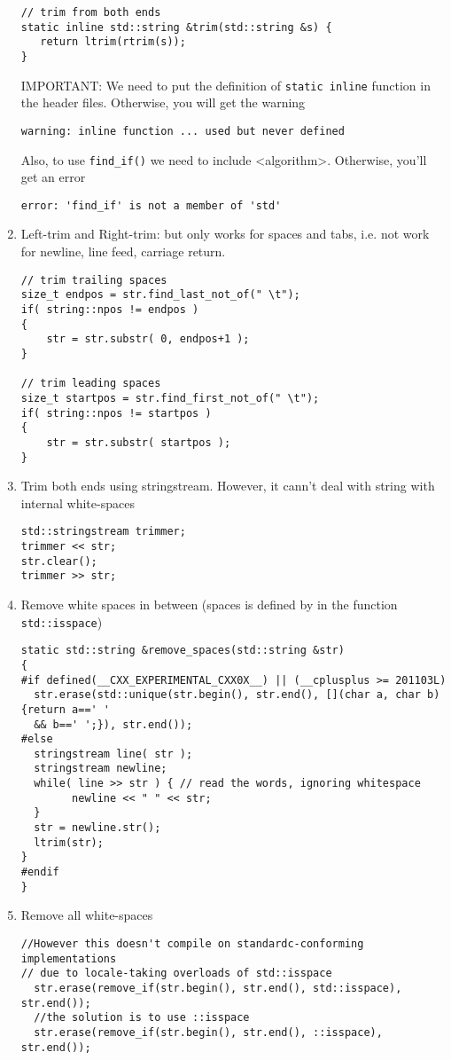 \begin{enumerate}
\begin{verbatim}
// trim from both ends
static inline std::string &trim(std::string &s) {
   return ltrim(rtrim(s));
}  
  \end{verbatim}
IMPORTANT: We need to put the definition of \verb!static inline! function in the
header files. Otherwise, you will get the warning
\begin{verbatim}
warning: inline function ... used but never defined
\end{verbatim}
Also, to use \verb!find_if()! we need to include <algorithm>. Otherwise, you'll
get an error
\begin{verbatim}
error: 'find_if' is not a member of 'std'
\end{verbatim}
  
  \item Left-trim and Right-trim: but only works for spaces and tabs, i.e. not
  work for newline, line feed, carriage return.
\begin{verbatim}
// trim trailing spaces
size_t endpos = str.find_last_not_of(" \t");
if( string::npos != endpos )
{
    str = str.substr( 0, endpos+1 );
}

// trim leading spaces
size_t startpos = str.find_first_not_of(" \t");
if( string::npos != startpos )
{
    str = str.substr( startpos );
}
\end{verbatim}
  \item Trim both ends using stringstream. However, it cann't
  deal with string with internal white-spaces
\begin{verbatim}
std::stringstream trimmer;
trimmer << str;
str.clear();
trimmer >> str;
\end{verbatim}

  \item Remove white spaces in between (spaces is defined by in the function
  \verb!std::isspace!)
\begin{verbatim}
static std::string &remove_spaces(std::string &str)
{
#if defined(__CXX_EXPERIMENTAL_CXX0X__) || (__cplusplus >= 201103L)
  str.erase(std::unique(str.begin(), str.end(), [](char a, char b){return a==' '
  && b==' ';}), str.end());
#else
  stringstream line( str );
  stringstream newline;
  while( line >> str ) { // read the words, ignoring whitespace
        newline << " " << str;
  }
  str = newline.str();
  ltrim(str);
}
#endif
}
\end{verbatim}
 
  \item Remove all white-spaces
\begin{verbatim}
//However this doesn't compile on standardc-conforming implementations
// due to locale-taking overloads of std::isspace
  str.erase(remove_if(str.begin(), str.end(), std::isspace), str.end());
  //the solution is to use ::isspace  
  str.erase(remove_if(str.begin(), str.end(), ::isspace), str.end());


\end{verbatim}
\end{enumerate}
